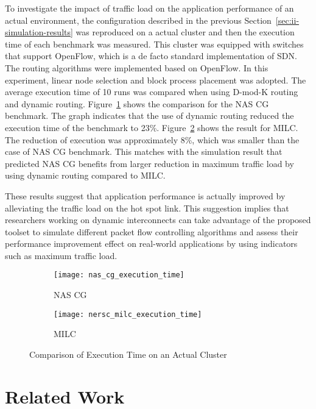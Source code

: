 To investigate the impact of traffic load on the application performance of an
actual environment, the configuration described in the previous
Section~\ref{sec:ii-simulation-results} was reproduced on a actual cluster and
then the execution time of each benchmark was measured. This cluster was
equipped with switches that support OpenFlow, which is a de facto standard
implementation of SDN\@. The routing algorithms were implemented based on
OpenFlow. In this experiment, linear node selection and block process
placement was adopted. The average execution time of 10 runs was compared when
using \mbox{D-mod-K} routing and dynamic routing. Figure~\ref{fig:nas-cg-time}
shows the comparison for the NAS CG benchmark. The graph indicates that the
use of dynamic routing reduced the execution time of the benchmark to 23\%.
Figure~\ref{fig:nersc-milc-time} shows the result for MILC\@. The reduction of
execution was approximately 8\%, which was smaller than the case of NAS CG
benchmark. This matches with the simulation result that predicted NAS CG
benefits from larger reduction in maximum traffic load by using dynamic
routing compared to MILC\@.

These results suggest that application performance is actually improved
by alleviating the traffic load on the hot spot link. This suggestion
implies that researchers working on dynamic interconnects can take advantage
of the proposed toolset to simulate different packet flow controlling
algorithms and assess their performance improvement effect on real-world
applications by using indicators such as maximum traffic load.

\begin{figure}
    \begin{subfigure}{.47\linewidth}
        \centering
        \texttt{[image: nas\_cg\_execution\_time]}
        \caption{NAS CG}%
        \label{fig:nas-cg-time}
    \end{subfigure}%
    \begin{subfigure}{.47\linewidth}
        \centering
        \texttt{[image: nersc\_milc\_execution\_time]}
        \caption{MILC}%
        \label{fig:nersc-milc-time}
    \end{subfigure}
    \caption{Comparison of Execution Time on an Actual Cluster}%
    \label{fig:single-job-time}
\end{figure}

\section{Related Work}\label{sec:ii-related-work}

